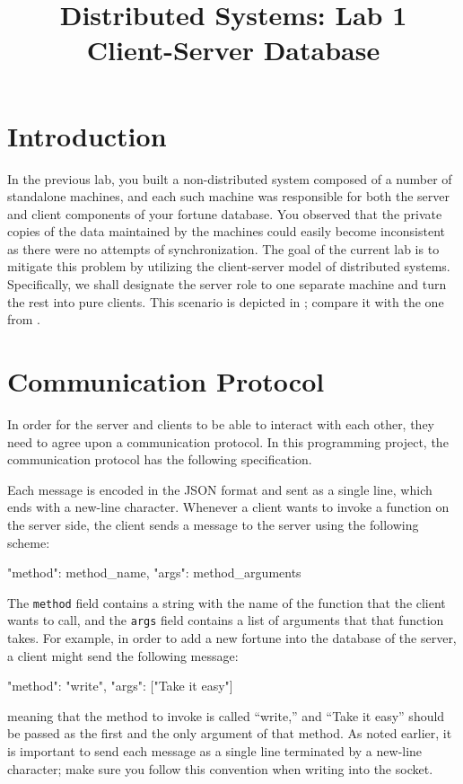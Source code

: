 \documentclass[a4paper]{article}
\title{%
  Distributed Systems: Lab 1\\%
  Client-Server Database%
}
\author{}
\date{}
\begin{document}
\maketitle

\section{Introduction}


In the previous lab, you built a non-distributed system composed of a number of
standalone machines, and each such machine was responsible for both the server
and client components of your fortune database. You observed that the private
copies of the data maintained by the machines could easily become inconsistent
as there were no attempts of synchronization. The goal of the current lab is to
mitigate this problem by utilizing the client-server model \cite{lecture2} of
distributed systems. Specifically, we shall designate the server role to one
separate machine and turn the rest into pure clients. This scenario is depicted
in ; compare it with the one from .

\section{Communication Protocol} 
In order for the server and clients to be able to interact with each other, they
need to agree upon a communication protocol. In this programming project, the
communication protocol has the following specification.

Each message is encoded in the JSON format \cite{json, python-json} and sent as
a single line, which ends with a new-line character. Whenever a client wants to
invoke a function on the server side, the client sends a message to the server
using the following scheme:
\begin{json}
{
    "method": method_name,
    "args": method_arguments
}
\end{json}
The \texttt{method} field contains a string with the name of the function that
the client wants to call, and the \texttt{args} field contains a list of
arguments that that function takes. For example, in order to add a new fortune
into the database of the server, a client might send the following message:
\begin{json}
{
    "method": "write",
    "args": ["Take it easy"]
}
\end{json}
meaning that the method to invoke is called ``write,'' and ``Take it easy''
should be passed as the first and the only argument of that method. As noted
earlier, it is important to send each message as a single line terminated by a
new-line character; make sure you follow this convention when writing into the
socket.
\end{document}
